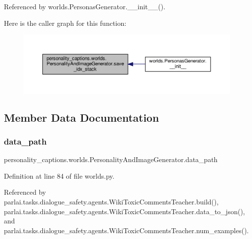 Referenced by worlds.\+Personas\+Generator.\+\_\+\+\_\+init\+\_\+\+\_\+().

Here is the caller graph for this function\+:
\nopagebreak
\begin{figure}[H]
\begin{center}
\leavevmode
\includegraphics[width=350pt]{classpersonality__captions_1_1worlds_1_1PersonalityAndImageGenerator_af76fb5f34ce3555d6e56edf5ad8de390_icgraph}
\end{center}
\end{figure}


\subsection{Member Data Documentation}
\mbox{\label{classpersonality__captions_1_1worlds_1_1PersonalityAndImageGenerator_a8cf3e5e992828f839a1431fa76550d1c}} 
\subsubsection{\texorpdfstring{data\+\_\+path}{data\_path}}
{\footnotesize\ttfamily personality\+\_\+captions.\+worlds.\+Personality\+And\+Image\+Generator.\+data\+\_\+path}



Definition at line 84 of file worlds.\+py.



Referenced by parlai.\+tasks.\+dialogue\+\_\+safety.\+agents.\+Wiki\+Toxic\+Comments\+Teacher.\+build(), parlai.\+tasks.\+dialogue\+\_\+safety.\+agents.\+Wiki\+Toxic\+Comments\+Teacher.\+data\+\_\+to\+\_\+json(), and parlai.\+tasks.\+dialogue\+\_\+safety.\+agents.\+Wiki\+Toxic\+Comments\+Teacher.\+num\+\_\+examples().

